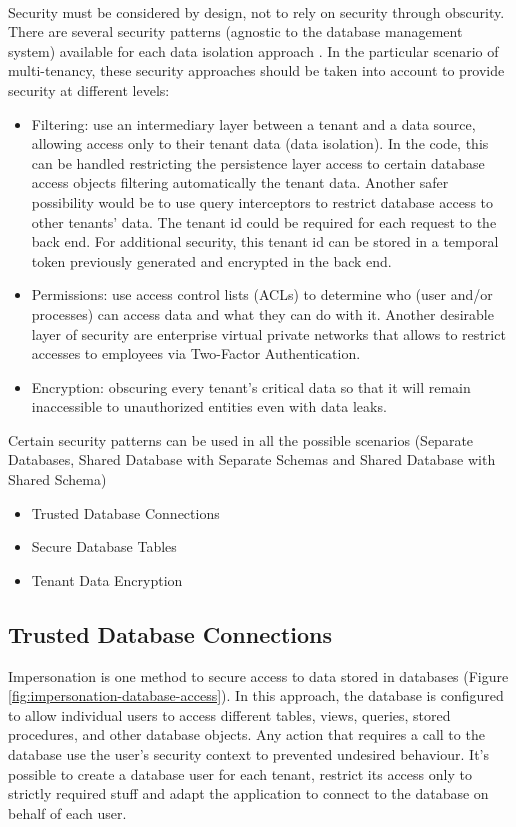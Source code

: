 \documentclass[11pt,english]{article} %
\begin{document}
\

Security must be considered by design, not to rely on security through obscurity.
There are several security patterns (agnostic to the database management system) available for each data isolation approach \cite{multi-tenant-data-architecture}.
In the particular scenario of multi-tenancy, these security approaches should be taken into account to provide security at different levels:
\begin{itemize}
    \item Filtering: use an intermediary layer between a tenant and a data source, allowing access only to their tenant data (data isolation).
    In the code, this can be handled restricting the persistence layer access to certain database access objects filtering automatically the tenant data.
    Another safer possibility would be to use query interceptors to restrict database access to other tenants' data.
    The tenant id could be required for each request to the back end. For additional security, this tenant id can be stored in a temporal token previously generated and encrypted in the back end.
    \item Permissions: use access control lists (ACLs) to determine who (user and/or processes) can access data and what they can do with it. %
    Another desirable layer of security are enterprise virtual private networks that allows to restrict accesses to employees via Two-Factor Authentication.
    \item Encryption: obscuring every tenant's critical data so that it will remain inaccessible to unauthorized entities even with data leaks.
\end{itemize}

Certain security patterns can be used in all the possible scenarios (Separate Databases, Shared Database with Separate Schemas and Shared Database with Shared Schema)
\begin{itemize}
    \item Trusted Database Connections
    \item Secure Database Tables
    \item Tenant Data Encryption
\end{itemize}


\subsection{Trusted Database Connections}
Impersonation is one method to secure access to data stored in databases (Figure \ref{fig:impersonation-database-access}).
In this approach, the database is configured to allow individual users to access different tables, views, queries, stored procedures, and other database objects.
Any action that requires a call to the database use the user's security context to prevented undesired behaviour.
It's possible to create a database user for each tenant, restrict its access only to strictly required stuff and adapt the application to connect to the database on behalf of each user.
\end{document}
